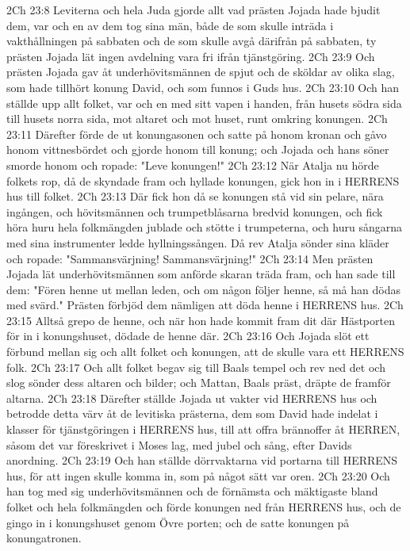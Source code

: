 2Ch 23:8  Leviterna och hela Juda gjorde allt vad prästen Jojada hade bjudit dem, var och en av dem tog sina män, både de som skulle inträda i vakthållningen på sabbaten och de som skulle avgå därifrån på sabbaten, ty prästen Jojada lät ingen avdelning vara fri ifrån tjänstgöring.
2Ch 23:9  Och prästen Jojada gav åt underhövitsmännen de spjut och de sköldar av olika slag, som hade tillhört konung David, och som funnos i Guds hus.
2Ch 23:10  Och han ställde upp allt folket, var och en med sitt vapen i handen, från husets södra sida till husets norra sida, mot altaret och mot huset, runt omkring konungen.
2Ch 23:11  Därefter förde de ut konungasonen och satte på honom kronan och gåvo honom vittnesbördet och gjorde honom till konung; och Jojada och hans söner smorde honom och ropade: "Leve konungen!"
2Ch 23:12  När Atalja nu hörde folkets rop, då de skyndade fram och hyllade konungen, gick hon in i HERRENS hus till folket.
2Ch 23:13  Där fick hon då se konungen stå vid sin pelare, nära ingången, och hövitsmännen och trumpetblåsarna bredvid konungen, och fick höra huru hela folkmängden jublade och stötte i trumpeterna, och huru sångarna med sina instrumenter ledde hyllningssången. Då rev Atalja sönder sina kläder och ropade: "Sammansvärjning! Sammansvärjning!"
2Ch 23:14  Men prästen Jojada lät underhövitsmännen som anförde skaran träda fram, och han sade till dem: "Fören henne ut mellan leden, och om någon följer henne, så må han dödas med svärd." Prästen förbjöd dem nämligen att döda henne i HERRENS hus.
2Ch 23:15  Alltså grepo de henne, och när hon hade kommit fram dit där Hästporten för in i konungshuset, dödade de henne där.
2Ch 23:16  Och Jojada slöt ett förbund mellan sig och allt folket och konungen, att de skulle vara ett HERRENS folk.
2Ch 23:17  Och allt folket begav sig till Baals tempel och rev ned det och slog sönder dess altaren och bilder; och Mattan, Baals präst, dräpte de framför altarna.
2Ch 23:18  Därefter ställde Jojada ut vakter vid HERRENS hus och betrodde detta värv åt de levitiska prästerna, dem som David hade indelat i klasser för tjänstgöringen i HERRENS hus, till att offra brännoffer åt HERREN, såsom det var föreskrivet i Moses lag, med jubel och sång, efter Davids anordning.
2Ch 23:19  Och han ställde dörrvaktarna vid portarna till HERRENS hus, för att ingen skulle komma in, som på något sätt var oren.
2Ch 23:20  Och han tog med sig underhövitsmännen och de förnämsta och mäktigaste bland folket och hela folkmängden och förde konungen ned från HERRENS hus, och de gingo in i konungshuset genom Övre porten; och de satte konungen på konungatronen.
